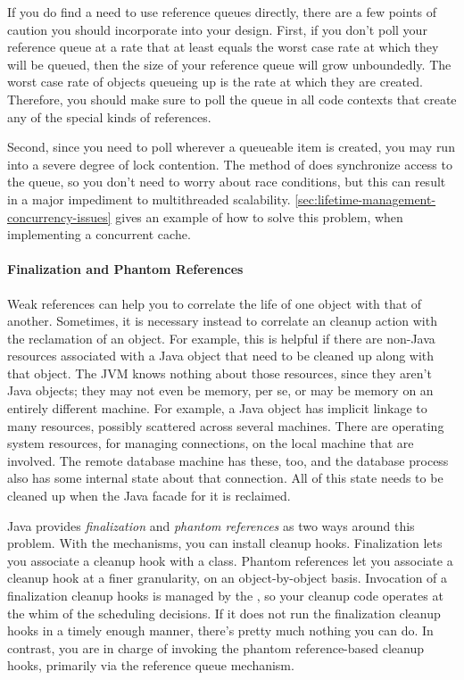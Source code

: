 If you do find a need to use reference queues directly, there are a few points
of caution you should incorporate into your design. First,
if you don't poll your reference queue at a rate that at least equals the worst
case rate at which they will be queued, then the size of your reference queue
will grow unboundedly. The worst case rate of objects queueing up is the rate at
which they are created. Therefore, you should make sure to poll the queue in all
code contexts that create any of the special kinds of references. 

Second, since you need to poll wherever a queueable item is created, you may run
into a severe degree of lock contention. The  method of
 does synchronize access to the queue, so you don't need
to worry about race conditions, but this can result in a major impediment to
multithreaded scalability. \autoref{sec:lifetime-management-concurrency-issues}
gives an example of how to solve this problem, when implementing a concurrent
cache.


\paragraph{Finalization and Phantom References}

Weak references can help you to correlate the life of one object with that of
another. Sometimes, it is necessary instead to correlate an cleanup action with
the reclamation of an object. For example, this is helpful if there are non-Java
resources associated with a Java object that need to be cleaned up along with
that object. The JVM knows nothing about those resources, since they aren't Java
objects; they may not even be memory, per se, or may be memory on an entirely
different machine. For example, a Java  object has
implicit linkage to many resources, possibly scattered across several machines.
There are operating system resources, for managing connections, on the local
machine that are involved. The remote database machine has these, too, and the
database process also has some internal state about that connection. All of this
state needs to be cleaned up when the Java facade for it is reclaimed.

Java provides \emph{finalization} and \emph{phantom references} as two ways
around this problem. With the
mechanisms, you can install cleanup hooks. Finalization lets you associate a
cleanup hook with a class. Phantom references let you associate a cleanup hook
at a finer granularity, on an object-by-object basis. Invocation of a
finalization cleanup hooks is managed by the \jre, so your cleanup code operates
at the whim of the \jres scheduling decisions. If it does not run the
finalization cleanup hooks in a timely enough manner, there's pretty much
nothing you can do. In contrast, you are in charge of invoking the phantom
reference-based cleanup hooks, primarily via the reference queue mechanism.



